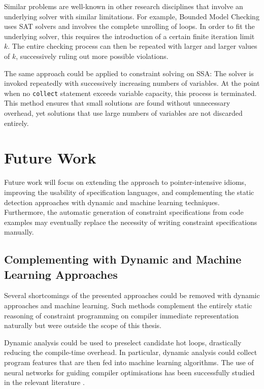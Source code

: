     Similar problems are well-known in other research disciplines that involve
    an underlying solver with similar limitations.
    For example, Bounded Model Checking \cite{Clarke:2001:BMC:510986.510987}
    uses SAT solvers and involves the complete unrolling of loops.
    In order to fit the underlying solver, this requires the introduction of a
    certain finite iteration limit $k$.
    The entire checking process can then be repeated with larger and larger
    values of $k$, successively ruling out more possible violations.

    The same approach could be applied to constraint solving on SSA:
    The solver is invoked repeatedly with successively increasing numbers of
    variables.
    At the point when no \texttt{collect} statement exceeds variable
    capacity, this process is terminated.
    This method ensures that small solutions are found without unnecessary
    overhead, yet solutions that use large numbers of variables are not
    discarded entirely.

\section{Future Work}

    Future work will focus on extending the approach to pointer-intensive
    idioms, improving the usability of specification languages, and
    complementing the static detection approaches with dynamic and
    machine learning techniques.
    Furthermore, the automatic generation of constraint specifications from
    code examples may eventually replace the necessity of writing constraint
    specifications manually.

\subsection*{Complementing with Dynamic and Machine Learning Approaches}

    Several shortcomings of the presented approaches could be removed with
    dynamic approaches and machine learning.
    Such methods complement the entirely static reasoning of constraint
    programming on compiler immediate representation naturally but were
    outside the scope of this thesis.

    Dynamic analysis could be used to preselect candidate hot loops, drastically
    reducing the compile-time overhead.
    In particular, dynamic analysis could collect program features that are
    then fed into machine learning algorithms.
    The use of neural networks for guiding compiler optimisations has been
    successfully studied in the relevant literature
    \citep{DBLP:journals/pieee/WangO18}.

